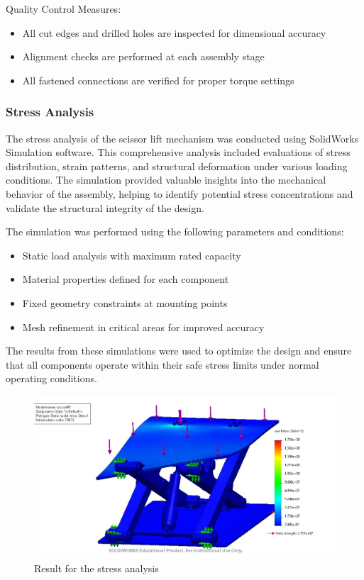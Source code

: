 \documentclass[../../main]{subfiles}
\begin{document}
Quality Control Measures:

\begin{itemize}
\item
  All cut edges and drilled holes are inspected for dimensional accuracy
\item
  Alignment checks are performed at each assembly stage
\item
  All fastened connections are verified for proper torque settings
\end{itemize}

\subsubsection{Stress Analysis}\label{stress-analysis}

The stress analysis of the scissor lift mechanism was conducted using
SolidWorks Simulation software. This comprehensive analysis included
evaluations of stress distribution, strain patterns, and structural
deformation under various loading conditions. The simulation provided
valuable insights into the mechanical behavior of the assembly, helping
to identify potential stress concentrations and validate the structural
integrity of the design.

The simulation was performed using the following parameters and
conditions:

\begin{itemize}
\item
  Static load analysis with maximum rated capacity
\item
  Material properties defined for each component
\item
  Fixed geometry constraints at mounting points
\item
  Mesh refinement in critical areas for improved accuracy
\end{itemize}

The results from these simulations were used to optimize the design and
ensure that all components operate within their safe stress limits under
normal operating conditions.

\begin{figure}[h!]
\centering
\includegraphics[width=\textwidth]{img/image103.jpg}
\caption{Result for the stress analysis}
\label{bmfig14}
\end{figure}
\end{document}
